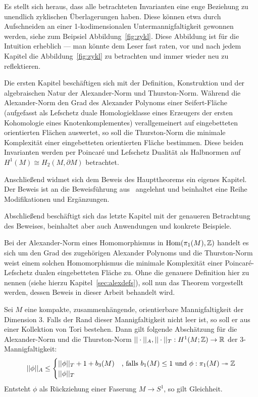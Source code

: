     Es stellt sich heraus, dass alle betrachteten Invarianten eine enge Beziehung zu unendlich zyklischen Überlagerungen haben. Diese können etwa durch Aufschneiden an einer 1-kodimensionalen Untermannigfaltigkeit gewonnen werden, siehe zum Beipsiel Abbildung~\ref{fig:zykl}. Diese Abbildung ist für die Intuition erheblich --- man könnte dem Leser fast raten, vor und nach jedem Kapitel die Abbildung~\ref{fig:zykl} zu betrachten und immer wieder neu zu reflektieren.

	Die ersten Kapitel beschäftigen sich mit der Definition, Konstruktion und der algebraischen Natur der Alexander-Norm und Thurston-Norm. Während die Alexander-Norm den Grad des Alexander Polynoms einer Seifert-Fläche (aufgefasst als Lefschetz duale Homologieklasse eines Erzeugers der ersten Kohomologie eines Knotenkomplementes) verallgemeinert auf eingebetteten orientierten Flächen auswertet, so soll die Thurston-Norm die minimale Komplexität einer eingebetteten orientierten Fläche bestimmen. Diese beiden Invarianten werden per Poincaré und Lefschetz Dualität als Halbnormen auf $H^1(M) \cong H_2(M,\partial M)$ betrachtet.

	Anschließend widmet sich dem Beweis des Haupttheorems ein eigenes Kapitel. Der Beweis ist an die Beweisführung aus~\cite{MCMULLEN.2002} angelehnt und beinhaltet eine Reihe Modifikationen und Ergänzungen. 

	Abschließend beschäftigt sich das letzte Kapitel mit der genaueren Betrachtung des Beweises, beinhaltet aber auch Anwendungen und konkrete Beispiele.

    Bei der Alexander-Norm eines Homomorphismus in $\operatorname{Hom}(\pi_1(M),\mathbb{Z})$ handelt es sich um den Grad des zugehörigen Alexander Polynoms und die Thurston-Norm weist einem solchen Homomorphismus die minimale Komplexität einer Poincaré-Lefschetz dualen eingebetteten Fläche zu. Ohne die genauere Definition hier zu nennen (siehe hierzu Kapitel~\ref{sec:alexdefs}), soll nun das Theorem vorgestellt werden, dessen Beweis in dieser Arbeit behandelt wird.
    \begin{thm}[McMullen]
    \label{thm:haupttheorem}
    	Sei $M$ eine kompakte, zusammenhängende, orientierbare Mannigfaltigkeit der Dimension 3. Falls der Rand dieser Mannigfaltigkeit nicht leer ist, so soll er aus einer Kollektion von Tori bestehen. Dann gilt folgende Abschätzung für die Alexander-Norm und die Thurston-Norm $||\cdot||_A ,||\cdot||_T : H^1(M;\mathbb{Z}) \to \mathbb{R}$ der 3-Mannigfaltigkeit:
    	\[
    		||\phi||_A \leq 
    		\begin{cases}
    			||\phi||_T + 1+ b_3(M) &\text{, falls } b_1(M)\leq 1 \text{ und } \phi: \pi_1(M) \twoheadrightarrow \mathbb{Z} \\
    			||\phi||_T &
    		\end{cases}
    	\]
    	Entsteht $\phi$ als Rückziehung einer Faserung $M\to S^1$, so gilt Gleichheit.
    \end{thm}